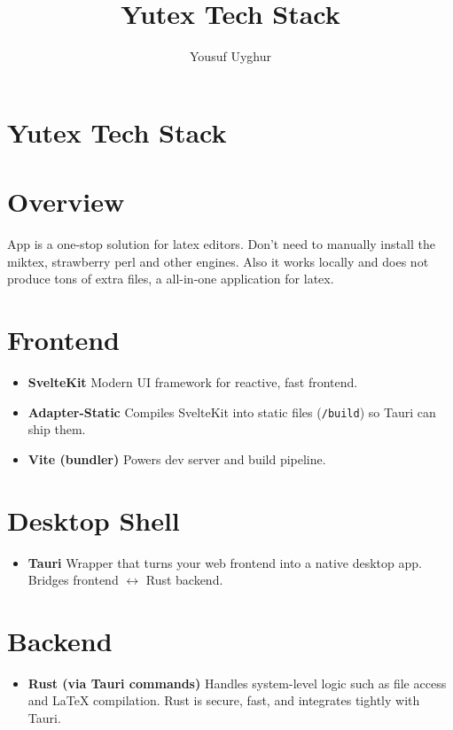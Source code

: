 \documentclass[12pt,a4paper]{article}
\title{Yutex Tech Stack}
\author{Yousuf Uyghur}
\date{}
\begin{document}
\maketitle

\section*{Yutex Tech Stack}

\section*{Overview}
App is a one-stop solution for latex editors. Don't need to manually install the miktex, strawberry perl and other engines. Also it works locally and does not produce tons of 
extra files, a all-in-one application for latex. 

\section*{Frontend}
\begin{itemize}
    \item \textbf{SvelteKit}  
    Modern UI framework for reactive, fast frontend.
    \item \textbf{Adapter-Static}  
    Compiles SvelteKit into static files (\texttt{/build}) so Tauri can ship them.
    \item \textbf{Vite (bundler)}  
    Powers dev server and build pipeline.
\end{itemize}

\section*{Desktop Shell}
\begin{itemize}
    \item \textbf{Tauri}  
    Wrapper that turns your web frontend into a native desktop app.  
    Bridges frontend $\leftrightarrow$ Rust backend.
\end{itemize}

\section*{Backend}
\begin{itemize}
    \item \textbf{Rust (via Tauri commands)}  
    Handles system-level logic such as file access and LaTeX compilation.  
    Rust is secure, fast, and integrates tightly with Tauri.
\end{itemize}
\end{document}
